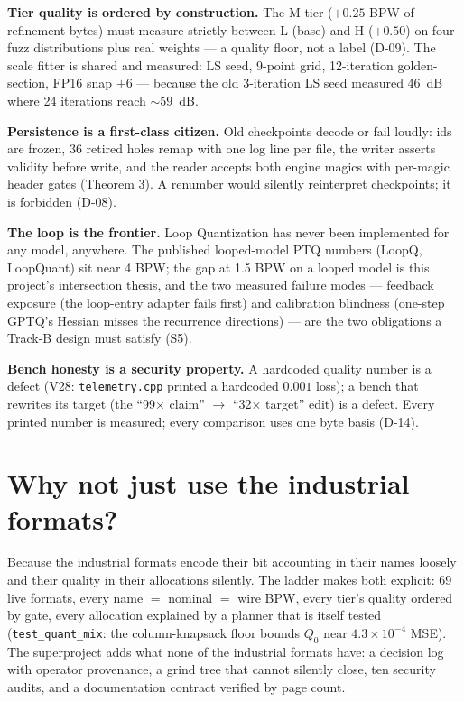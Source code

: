 \textbf{Tier quality is ordered by construction.} The M tier ($+0.25$ BPW of refinement bytes)
must measure strictly between L (base) and H ($+0.50$) on four fuzz distributions plus real
weights --- a quality floor, not a label (D-09). The scale fitter is shared and measured:
LS seed, 9-point grid, 12-iteration golden-section, FP16 snap $\pm6$ --- because the old
3-iteration LS seed measured 46~dB where 24 iterations reach ${\sim}59$~dB.

\textbf{Persistence is a first-class citizen.} Old checkpoints decode or fail loudly: ids are
frozen, 36 retired holes remap with one log line per file, the writer asserts validity before
write, and the reader accepts both engine magics with per-magic header gates (Theorem 3). A
renumber would silently reinterpret checkpoints; it is forbidden (D-08).

\textbf{The loop is the frontier.} Loop Quantization has never been implemented for any model,
anywhere. The published looped-model PTQ numbers (LoopQ, LoopQuant) sit near 4 BPW; the gap at
1.5 BPW on a looped model is this project's intersection thesis, and the two measured failure
modes --- feedback exposure (the loop-entry adapter fails first) and calibration blindness
(one-step GPTQ's Hessian misses the recurrence directions) --- are the two obligations a
Track-B design must satisfy (S5).

\textbf{Bench honesty is a security property.} A hardcoded quality number is a defect
(V28: \texttt{telemetry.cpp} printed a hardcoded $0.001$ loss); a bench that rewrites its
target (the ``99$\times$ claim'' $\to$ ``32$\times$ target'' edit) is a defect. Every printed
number is measured; every comparison uses one byte basis (D-14).

\section{Why not just use the industrial formats?}

Because the industrial formats encode their bit accounting in their names loosely and their
quality in their allocations silently. The ladder makes both explicit: 69 live formats, every
name $=$ nominal $=$ wire BPW, every tier's quality ordered by gate, every allocation explained
by a planner that is itself tested (\texttt{test\_quant\_mix}: the column-knapsack floor bounds
$Q_0$ near $4.3\times10^{-4}$ MSE). The superproject adds what none of the industrial formats
have: a decision log with operator provenance, a grind tree that cannot silently close, ten
security audits, and a documentation contract verified by page count.
